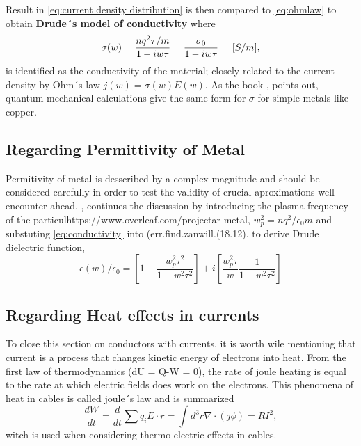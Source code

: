 Result in \ref{eq:current density distribution} is then compared to \ref{eq:ohmlaw} to obtain \textbf{Drude´s model of conductivity} where
\begin{equation}
\label{eq:conductivity}
    \sigma(w) = \frac{nq^2 \tau/m}{1-iw\tau} = \frac{\sigma_0}{1-iw\tau} \hspace{0.5 cm}[S/m], 
\end{equation}
is identified as the conductivity of the material; closely related to the current density by Ohm´s law $ j(w) = \sigma(w) E(w)$. As the book \cite{jackson1999classical}, points out, quantum mechanical calculations give the same form for $\sigma$ for simple metals like copper.
\\

\subsection{Regarding Permittivity of Metal}
Permitivity of metal is desscribed by a complex magnitude and should be considered carefully in order to test the validity of crucial aproximations well encounter ahead. 
\cite{jackson1999classical}, continues the discussion by introducing the plasma frequency of the particulhttps://www.overleaf.com/projectar metal, $w_p ^2 = nq^2/\epsilon_0m$ and substuting \ref{eq:conductivity} into (err.find.zanwill.(18.12).  to derive Drude dielectric function,
\begin{equation}
\label{eq:Drude dielectric function}
    \epsilon(w) / \epsilon_0 = [1-\frac{w_p^2 \tau^2}{1+w^2\tau^2}]+i[\frac{w_p^2\tau}{w}\frac{1}{1+w^2\tau^2}]
\end{equation}

\subsection{Regarding Heat effects in currents}
To close this section on conductors with currents, it is worth wile mentioning that current is a process that changes kinetic energy of electrons into heat.  From the first law of thermodynamics (dU = Q-W = 0), the rate of joule heating is equal to the rate at which electric fields does work on the electrons. This phenomena of heat in cables is called joule´s law and is summarized
\begin{equation}
    \frac{dW}{dt} = \frac{d}{dt} \sum q_i E \cdot r = \int d^3r \nabla \cdot (j\phi) = RI^2,
\end{equation}
witch is used when considering thermo-electric effects in cables. 